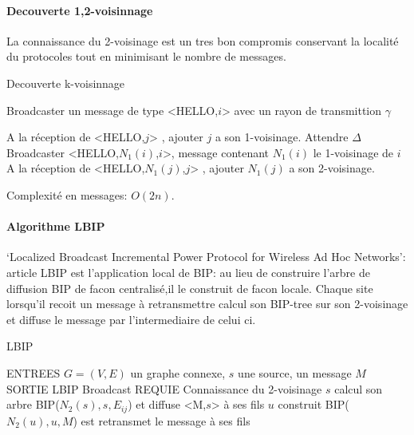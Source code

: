 \paragraph{Decouverte 1,2-voisinnage}

La connaissance du 2-voisinage est un tres bon compromis conservant la localité du protocoles tout en minimisant le nombre de messages.


\begin{algorithm}[h]
\caption{Decouverte k-voisinnage}
\label{algo_k_voisinnage}
\begin{algorithmic}

	\STATE Broadcaster un message de type <HELLO,$i$> avec un rayon de transmittion $\gamma$
\ENDFOR

\STATE A la réception de <HELLO,$j$> , ajouter $j$ a son 1-voisinage.
\STATE Attendre $\Delta$
	\STATE Broadcaster <HELLO,$N_1(i)$,$i$>, message contenant $N_1(i)$ le 1-voisinage de $i$
	\STATE A la réception de <HELLO,$N_1(j)$,$j$> , ajouter $N_1(j)$ a son 2-voisinage.
	
\ENDFOR
\end{algorithmic}
\end{algorithm}

Complexité en messages: $O(2n)$.


\paragraph{Algorithme LBIP}  `Localized Broadcast Incremental Power Protocol for Wireless Ad Hoc Networks': article \cite{Ingelrest2004}
LBIP est l'application local de BIP: au lieu de construire l'arbre de diffusion BIP de facon centralisé,il le construit de facon locale.
Chaque site lorsqu'il recoit un message à retransmettre calcul son BIP-tree sur son 2-voisinage et diffuse le message par l'intermediaire de celui ci.

\begin{algorithm}[h]
\caption{LBIP}
\label{algo_LBIP}
\begin{algorithmic}
\STATE ENTREES  $G=(V,E)$ un graphe connexe, $s$ une source, un message $M$
\STATE SORTIE  LBIP Broadcast
\STATE REQUIE  Connaissance du 2-voisinage
\STATE $s$ calcul son arbre BIP($N_2(s),s,E_{ij}$) et diffuse <M,$s$> à ses fils
		\STATE $u$ construit BIP($N_2(u),u,M$) est retransmet le message à ses fils
	\ENDIF
\ENDIF
\end{algorithmic}
\end{algorithm}

